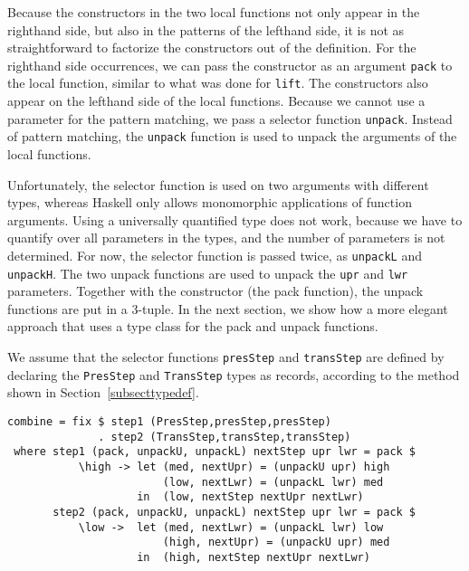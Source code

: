 \par Because the constructors in the two local functions not only appear in
        the righthand side, but also in the patterns of the lefthand side, it is not as
        straightforward to factorize the constructors out of the definition. For the
        righthand side occurrences, we can pass the constructor as an argument
        \texttt{pack} to the local function, similar to what was done for
        \texttt{lift}. The constructors also appear on the lefthand side of the local
        functions. Because we cannot use a parameter for the pattern matching, we pass
        a selector function \texttt{unpack}. Instead of pattern matching, the
        \texttt{unpack} function is used to unpack the arguments of the local
        functions.
\par Unfortunately, the selector function is used on two arguments with
        different types, whereas Haskell only allows monomorphic applications of
        function arguments. Using a universally quantified type does not work, because
        we have to quantify over all parameters in the types, and the number of
        parameters is not determined. For now, the selector function is passed twice,
        as \texttt{unpackL} and \texttt{unpackH}. The two unpack functions are used to
        unpack the \texttt{upr} and \texttt{lwr} parameters. Together with the
        constructor (the pack function), the unpack functions are put in a 3-tuple. In
        the next section, we show how a more elegant approach that uses a type class
        for the pack and unpack functions.
\par We assume that the selector functions \texttt{presStep} and
        \texttt{transStep} are defined by declaring the \texttt{PresStep} and
        \texttt{TransStep} types as records, according to the method shown in
        Section~\ref{subsecttypedef}.\begin{small}\begin{verbatim}combine = fix $ step1 (PresStep,presStep,presStep) 
              . step2 (TransStep,transStep,transStep) 
 where step1 (pack, unpackU, unpackL) nextStep upr lwr = pack $
           \high -> let (med, nextUpr) = (unpackU upr) high
                        (low, nextLwr) = (unpackL lwr) med
                    in  (low, nextStep nextUpr nextLwr)
       step2 (pack, unpackU, unpackL) nextStep upr lwr = pack $
           \low ->  let (med, nextLwr) = (unpackL lwr) low
                        (high, nextUpr) = (unpackU upr) med
                    in  (high, nextStep nextUpr nextLwr)\end{verbatim}\end{small}

